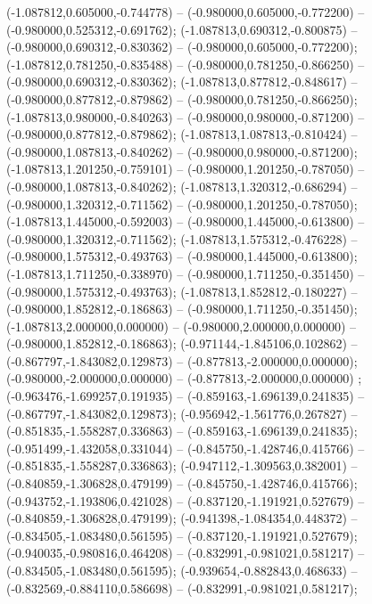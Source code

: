  (-1.087812,0.605000,-0.744778) -- (-0.980000,0.605000,-0.772200) -- (-0.980000,0.525312,-0.691762);
 (-1.087813,0.690312,-0.800875) -- (-0.980000,0.690312,-0.830362) -- (-0.980000,0.605000,-0.772200);
 (-1.087812,0.781250,-0.835488) -- (-0.980000,0.781250,-0.866250) -- (-0.980000,0.690312,-0.830362);
 (-1.087813,0.877812,-0.848617) -- (-0.980000,0.877812,-0.879862) -- (-0.980000,0.781250,-0.866250);
 (-1.087813,0.980000,-0.840263) -- (-0.980000,0.980000,-0.871200) -- (-0.980000,0.877812,-0.879862);
 (-1.087813,1.087813,-0.810424) -- (-0.980000,1.087813,-0.840262) -- (-0.980000,0.980000,-0.871200);
 (-1.087813,1.201250,-0.759101) -- (-0.980000,1.201250,-0.787050) -- (-0.980000,1.087813,-0.840262);
 (-1.087813,1.320312,-0.686294) -- (-0.980000,1.320312,-0.711562) -- (-0.980000,1.201250,-0.787050);
 (-1.087813,1.445000,-0.592003) -- (-0.980000,1.445000,-0.613800) -- (-0.980000,1.320312,-0.711562);
 (-1.087813,1.575312,-0.476228) -- (-0.980000,1.575312,-0.493763) -- (-0.980000,1.445000,-0.613800);
 (-1.087813,1.711250,-0.338970) -- (-0.980000,1.711250,-0.351450) -- (-0.980000,1.575312,-0.493763);
 (-1.087813,1.852812,-0.180227) -- (-0.980000,1.852812,-0.186863) -- (-0.980000,1.711250,-0.351450);
 (-1.087813,2.000000,0.000000) -- (-0.980000,2.000000,0.000000) -- (-0.980000,1.852812,-0.186863);
 (-0.971144,-1.845106,0.102862) -- (-0.867797,-1.843082,0.129873) -- (-0.877813,-2.000000,0.000000);
 (-0.980000,-2.000000,0.000000) -- (-0.877813,-2.000000,0.000000) ;
 (-0.963476,-1.699257,0.191935) -- (-0.859163,-1.696139,0.241835) -- (-0.867797,-1.843082,0.129873);
 (-0.956942,-1.561776,0.267827) -- (-0.851835,-1.558287,0.336863) -- (-0.859163,-1.696139,0.241835);
 (-0.951499,-1.432058,0.331044) -- (-0.845750,-1.428746,0.415766) -- (-0.851835,-1.558287,0.336863);
 (-0.947112,-1.309563,0.382001) -- (-0.840859,-1.306828,0.479199) -- (-0.845750,-1.428746,0.415766);
 (-0.943752,-1.193806,0.421028) -- (-0.837120,-1.191921,0.527679) -- (-0.840859,-1.306828,0.479199);
 (-0.941398,-1.084354,0.448372) -- (-0.834505,-1.083480,0.561595) -- (-0.837120,-1.191921,0.527679);
 (-0.940035,-0.980816,0.464208) -- (-0.832991,-0.981021,0.581217) -- (-0.834505,-1.083480,0.561595);
 (-0.939654,-0.882843,0.468633) -- (-0.832569,-0.884110,0.586698) -- (-0.832991,-0.981021,0.581217);
